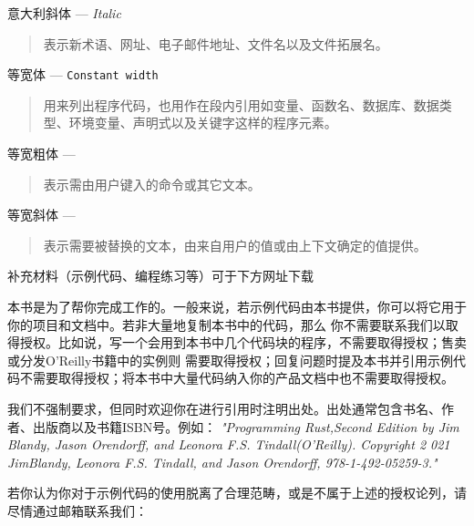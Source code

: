\medskip
意大利斜体 --- \textit{Italic}
    \begin{quote}
        表示新术语、网址、电子邮件地址、文件名以及文件拓展名。
    \end{quote}
\medskip
等宽体 --- \texttt{Constant width}
    \begin{quote}
        用来列出程序代码，也用作在段内引用如变量、函数名、数据库、数据类型、环境变量、声明式以及关键字这样的程序元素。
    \end{quote}
\medskip
等宽粗体 --- 
    \begin{quote}
        表示需由用户键入的命令或其它文本。
    \end{quote}
\medskip
等宽斜体 --- 
    \begin{quote}
        表示需要被替换的文本，由来自用户的值或由上下文确定的值提供。
    \end{quote}


补充材料（示例代码、编程练习等）可于下方网址下载

\smallskip
{}

\smallskip
本书是为了帮你完成工作的。一般来说，若示例代码由本书提供，你可以将它用于你的项目和文档中。若非大量地复制本书中的代码，那么
你不需要联系我们以取得授权。比如说，写一个会用到本书中几个代码块的程序，不需要取得授权；售卖或分发O'Reilly书籍中的实例则
需要取得授权；回复问题时提及本书并引用示例代码不需要取得授权；将本书中大量代码纳入你的产品文档中也不需要取得授权。

\medskip
我们不强制要求，但同时欢迎你在进行引用时注明出处。出处通常包含书名、作者、出版商以及书籍ISBN号。例如：
\textit{"Programming Rust,Second Edition by Jim Blandy, Jason Orendorff, and Leonora F.S. Tindall(O'Reilly). Copyright 2%
021 JimBlandy, Leonora F.S. Tindall, and Jason Orendorff, 978-1-492-05259-3."}

\medskip
若你认为你对于示例代码的使用脱离了合理范畴，或是不属于上述的授权论列，请尽情通过邮箱联系我们：

\smallskip
{}
\smallskip



